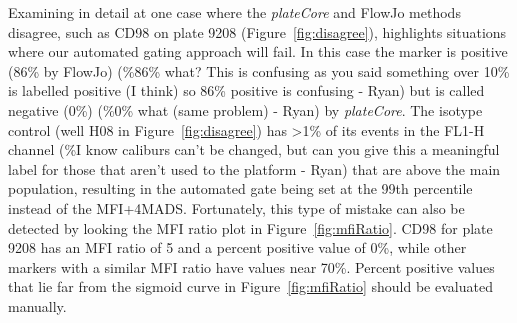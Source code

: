 \documentclass[12pt]{article}
\newcommand{\Rpackage}[1]{{\textit{#1}}}
\begin{document}
Examining in detail at one case where the \Rpackage{plateCore} and FlowJo
methods disagree, such as CD98 on plate 9208 (Figure~\ref{fig:disagree}),
highlights situations where our automated gating approach will fail. In this
case the marker is positive (86\% by FlowJo) (\%86\% what? This is confusing as
you said something over 10\% is labelled positive (I think) so 86\% positive is
confusing - Ryan) but is  called negative (0\%) (\%0\% what (same problem) -
Ryan) by \Rpackage{plateCore}. The isotype control (well H08 in
Figure~\ref{fig:disagree}) has >1\% of its events in the FL1-H channel (\%I
know caliburs can't be changed, but can you give this a meaningful label for
those that aren't used to the platform - Ryan) that are above the main
population, resulting in the automated gate being set at the 99th percentile
instead of the MFI+4MADS. Fortunately, this type of mistake can also be
detected by looking the MFI ratio plot in Figure~\ref{fig:mfiRatio}. CD98 for
plate 9208 has an MFI ratio of 5 and a percent positive value of 0\%, while
other markers with a similar MFI ratio have values near 70\%. Percent positive
values that lie far from the sigmoid curve in Figure~\ref{fig:mfiRatio} should
be evaluated manually.

\end{document}
